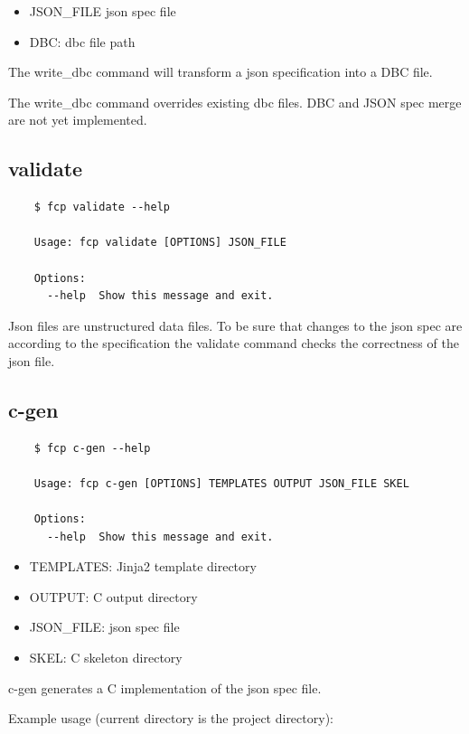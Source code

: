 \documentclass[11pt, a4paper]{article}
\begin{document}
\begin{itemize}
	\item JSON\_FILE json spec file
	\item DBC: dbc file path
\end{itemize}

The write\_dbc command will transform a json specification into a DBC file.

\danger The write\_dbc command overrides existing dbc files. DBC
and JSON spec merge are not yet implemented.

\subsection{validate}
\label{sec:usage:validate}

\begin{verbatim}
	$ fcp validate --help

	Usage: fcp validate [OPTIONS] JSON_FILE

	Options:
	  --help  Show this message and exit.
\end{verbatim}

Json files are unstructured data files. To be sure that changes to the json spec are according to the specification the validate command checks the correctness of the json file.

\subsection{c-gen}
\label{sec:usage:c-gen}

\begin{verbatim}
	$ fcp c-gen --help

	Usage: fcp c-gen [OPTIONS] TEMPLATES OUTPUT JSON_FILE SKEL

	Options:
	  --help  Show this message and exit.
\end{verbatim}

\begin{itemize}
	\item TEMPLATES: Jinja2 template directory
	\item OUTPUT: C output directory
	\item JSON\_FILE: json spec file
	\item SKEL: C skeleton directory
\end{itemize}

c-gen generates a C implementation of the json spec file.

Example usage (current directory is the project directory):
\end{document}
